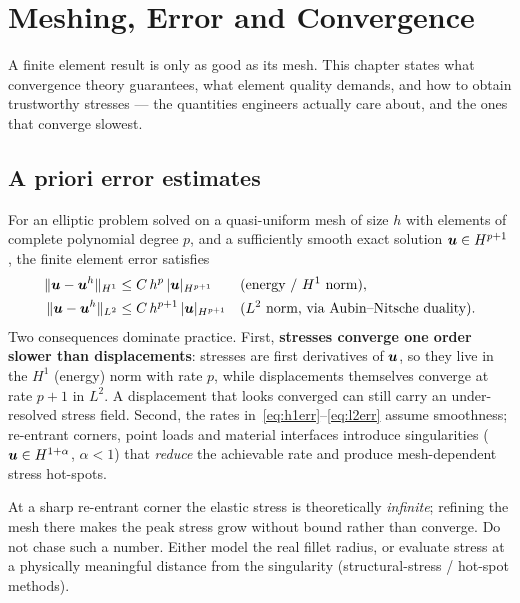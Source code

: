 \chapter{Meshing, Error and Convergence}
\label{ch:meshing-convergence}

A finite element result is only as good as its mesh. This chapter states
what convergence theory guarantees, what element quality demands, and how
to obtain trustworthy stresses --- the quantities engineers actually care
about, and the ones that converge slowest.

\section{A priori error estimates}

For an elliptic problem solved on a quasi-uniform mesh of size $h$ with
elements of complete polynomial degree $p$, and a sufficiently smooth
exact solution $\bm{u}\in H^{p+1}$, the finite element error satisfies
\begin{align}
  \lVert \bm{u}-\bm{u}^h\rVert_{H^1} &\le C\,h^{p}\,|\bm{u}|_{H^{p+1}}
    &&\text{(energy / }H^1\text{ norm)}, \label{eq:h1err}\\
  \lVert \bm{u}-\bm{u}^h\rVert_{L^2} &\le C\,h^{p+1}\,|\bm{u}|_{H^{p+1}}
    &&\text{(}L^2\text{ norm, via Aubin--Nitsche duality)} . \label{eq:l2err}
\end{align}
Two consequences dominate practice. First, \textbf{stresses converge one
order slower than displacements}: stresses are first derivatives of
$\bm{u}$, so they live in the $H^1$ (energy) norm with rate $p$, while
displacements themselves converge at rate $p+1$ in $L^2$. A displacement
that looks converged can still carry an under-resolved stress field.
Second, the rates in~\eqref{eq:h1err}--\eqref{eq:l2err} assume smoothness;
re-entrant corners, point loads and material interfaces introduce
singularities ($\bm{u}\in H^{1+\alpha}$, $\alpha<1$) that \emph{reduce} the
achievable rate and produce mesh-dependent stress hot-spots.

\begin{fcwarn}
At a sharp re-entrant corner the elastic stress is theoretically
\emph{infinite}; refining the mesh there makes the peak stress grow
without bound rather than converge. Do not chase such a number. Either
model the real fillet radius, or evaluate stress at a physically
meaningful distance from the singularity (structural-stress / hot-spot
methods).
\end{fcwarn}


